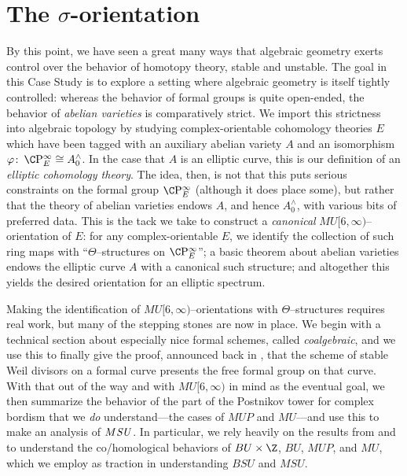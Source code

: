 
\chapter{The \texorpdfstring{\(\sigma\)}{sigma}-orientation}\label{ChapterSigmaOrientation}

By this point, we have seen a great many ways that algebraic geometry exerts control over the behavior of homotopy theory, stable and unstable.  The goal in this Case Study is to explore a setting where algebraic geometry is itself tightly controlled: whereas the behavior of formal groups is quite open-ended, the behavior of \emph{abelian varieties} is comparatively strict.  We import this strictness into algebraic topology by studying complex-orientable cohomology theories \(E\) which have been tagged with an auxiliary abelian variety \(A\) and an isomorphism \(\phi\co \CP^\infty_E \cong A^\wedge_0\).  In the case that \(A\) is an elliptic curve, this is our definition of an \textit{elliptic cohomology theory}.  The idea, then, is not that this puts serious constraints on the formal group \(\CP^\infty_E\) (although it does place some), but rather that the theory of abelian varieties endows \(A\), and hence \(A^\wedge_0\), with various bits of preferred data.  This is the tack we take to construct a \emph{canonical} \(MU[6, \infty)\)--orientation of \(E\): for any complex-orientable \(E\), we identify the collection of such ring maps with ``\(\Theta\)--structures on \(\CP^\infty_E\)''; a basic theorem about abelian varieties endows the elliptic curve \(A\) with a canonical such structure; and altogether this yields the desired orientation for an elliptic spectrum.

Making the identification of \(MU[6, \infty)\)--orientations with \(\Theta\)--structures requires real work, but many of the stepping stones are now in place.  We begin with a technical section about especially nice formal schemes, called \textit{coalgebraic}, and we use this to finally give the proof, announced back in , that the scheme of stable Weil divisors on a formal curve presents the free formal group on that curve.  With that out of the way and with \(MU[6, \infty)\) in mind as the eventual goal, we then summarize the behavior of the part of the Postnikov tower for complex bordism that we \emph{do} understand---the cases of \(MUP\) and \(MU\)---and use this to make an analysis of \(M\mathit{SU}\).  In particular, we rely heavily on the results from  and  to understand the co/homological behaviors of \(BU \times \Z\), \(BU\), \(MUP\), and \(MU\), which we employ as traction in understanding \(BSU\) and \(MSU\).


